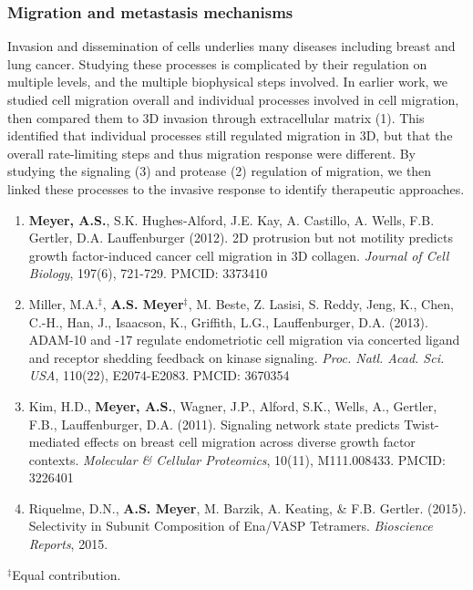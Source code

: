 \documentclass[11pt]{article}
\begin{document}
\subsubsection{Migration and metastasis mechanisms}

Invasion and dissemination of cells underlies many diseases including breast and lung cancer. Studying these processes is complicated by their regulation on multiple levels, and the multiple biophysical steps involved. In earlier work, we studied cell migration overall and individual processes involved in cell migration, then compared them to 3D invasion through extracellular matrix (1). This identified that individual processes still regulated migration in 3D, but that the overall rate-limiting steps and thus migration response were different. By studying the signaling (3) and protease (2) regulation of migration, we then linked these processes to the invasive response to identify therapeutic approaches.

\begin{enumerate}
  \item \textbf{Meyer, A.S.}, S.K. Hughes-Alford, J.E. Kay, A. Castillo, A. Wells, F.B. Gertler, D.A. Lauffenburger (2012). 2D protrusion but not motility predicts growth factor-induced cancer cell migration in 3D collagen. \emph{Journal of Cell Biology}, 197(6), 721-729. PMCID: 3373410
  \item Miller, M.A.$^\ddag$, \textbf{A.S. Meyer}$^\ddag$, M. Beste, Z. Lasisi, S. Reddy, Jeng, K., Chen, C.-H., Han, J., Isaacson, K., Griffith, L.G., Lauffenburger, D.A. (2013). ADAM-10 and -17 regulate endometriotic cell migration via concerted ligand and receptor shedding feedback on kinase signaling. \emph{Proc. Natl. Acad. Sci. USA}, 110(22), E2074-E2083. PMCID: 3670354
  \item Kim, H.D., \textbf{Meyer, A.S.}, Wagner, J.P., Alford, S.K., Wells, A., Gertler, F.B., Lauffenburger, D.A. (2011). Signaling network state predicts Twist-mediated effects on breast cell migration across diverse growth factor contexts. \emph{Molecular \& Cellular Proteomics}, 10(11), M111.008433. PMCID: 3226401
  \item Riquelme, D.N., \textbf{A.S. Meyer}, M. Barzik, A. Keating, \& F.B. Gertler. (2015). Selectivity in Subunit Composition of Ena/VASP Tetramers. \emph{Bioscience Reports}, 2015.
\end{enumerate}

\noindent $^\ddag$Equal contribution.
\end{document}
